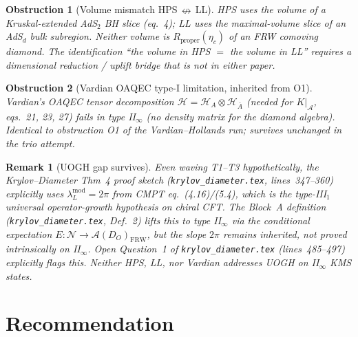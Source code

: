 \documentclass[11pt]{article}
\newtheorem{obstruction}{Obstruction}
\newtheorem{remark}{Remark}
\newcommand{\HH}{\mathcal{H}}
\newcommand{\AA}{\mathcal{A}}
\newcommand{\NN}{\mathcal{N}}
\newcommand{\FRW}{\mathrm{FRW}}
\newcommand{\Rprop}{R_{\mathrm{proper}}}
\begin{document}
\begin{obstruction}[Volume mismatch HPS$\,\nleftrightarrow\,$LL]\label{obs:T5}
HPS uses the volume of a Kruskal-extended AdS$_2$ BH slice (eq.~4); LL uses the
maximal-volume slice of an AdS$_d$ bulk subregion. Neither volume is
$\Rprop(\eta_c)$ of an FRW comoving diamond. The identification ``the volume in
HPS $=$ the volume in LL'' requires a dimensional reduction / uplift bridge that
is not in either paper.
\end{obstruction}

\begin{obstruction}[Vardian OAQEC type-I limitation, inherited from O1]\label{obs:T6}
Vardian's OAQEC tensor decomposition $\HH = \HH_A \otimes \HH_{\bar A}$
(needed for $K|_\AA$, eqs.~21, 23, 27) fails in type II$_\infty$ (no density
matrix for the diamond algebra). Identical to obstruction O1 of the
Vardian--Hollands run; survives unchanged in the trio attempt.
\end{obstruction}

\begin{remark}[UOGH gap survives]\label{rem:T4-residual}
Even waving T1--T3 hypothetically, the Krylov--Diameter Thm~4 proof sketch
(\texttt{krylov\_diameter.tex}, lines~347--360) explicitly uses
$\lambda_L^{\mathrm{mod}} = 2\pi$ from CMPT eq.~(4.16)/(5.4), which is the
type-III$_1$ universal operator-growth hypothesis on chiral CFT. The Block~A
definition (\texttt{krylov\_diameter.tex}, Def.~2) lifts this to type II$_\infty$
via the conditional expectation $E:\NN \to \AA(D_O)_\FRW$, but the slope
$2\pi$ remains \emph{inherited}, not proved intrinsically on II$_\infty$. Open
Question~1 of \texttt{krylov\_diameter.tex} (lines~485--497) explicitly flags
this. Neither HPS, LL, nor Vardian addresses UOGH on II$_\infty$ KMS states.
\end{remark}

\section{Recommendation}\label{sec:rec}
\end{document}
